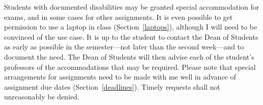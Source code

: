 Students with documented disabilities may be granted special accommodation for
exams, and in some cases for other assignments. It is even possible to get
permission to use a laptop in class (Section~\ref{laptops}), although I will
need to be convinced of the use case. It is up to the student to contact the
Dean of Students as early as possible in the semester---not later than the
second week---and to document the need. The Dean of Students will then advise
each of the student's professors of the accommodations that may be required.
Please note that special arrangements for assignments need to be made with me
well in advance of assignment due dates (Section~\ref{deadlines}). Timely
requests shall not unreasonably be denied.
